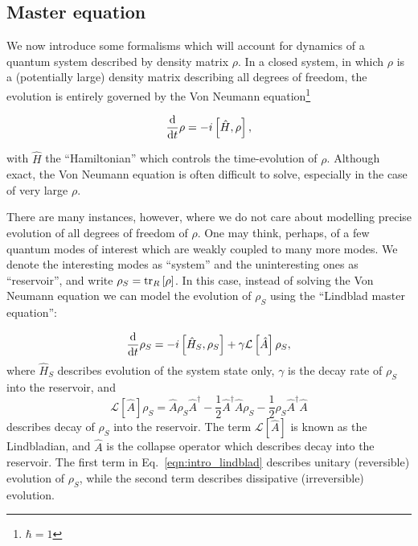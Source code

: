 \FloatBarrier
\subsection{Master equation}

We now introduce some formalisms which will account for dynamics of a quantum system described by density matrix $\rho$. In a closed system, in which $\rho$ is a (potentially large) density matrix describing all degrees of freedom, the evolution is entirely governed by the Von Neumann equation\footnote{$\hbar = 1$}

\begin{equation}
\frac{\mathrm{d}}{\mathrm{d}t} \rho = - i \left[\hat{H}, \rho \right],
\end{equation}

\noindent with $\hat{H}$ the ``Hamiltonian'' which controls the time-evolution of $\rho$. Although exact, the Von Neumann equation is often difficult to solve, especially in the case of very large $\rho$.

There are many instances, however, where we do not care about modelling precise evolution of all degrees of freedom of $\rho$. One may think, perhaps, of a few quantum modes of interest which are weakly coupled to many more modes. We denote the interesting modes as ``system'' and the uninteresting ones as ``reservoir'', and write $\rho_S = \tr_R\left[\rho\right]$. In this case, instead of solving the Von Neumann equation we can model the evolution of $\rho_S$ using the ``Lindblad master equation'':

\begin{equation}\label{eqn:intro_lindblad}
\frac{\mathrm{d}}{\mathrm{d}t} \rho_S = - i \left[ \hat{H}_S, \rho_S \right] + \gamma \mathcal{L}\left[\hat{A}\right] \rho_S,
\end{equation}
where $\hat{H}_S$ describes evolution of the system state only, $\gamma$ is the decay rate of $\rho_S$ into the reservoir, and 
\begin{equation}
\mathcal{L}\left[\hat{A}\right] \rho_S = \hat{A} \rho_S \hat{A}^\dagger - \frac{1}{2} \hat{A}^\dagger \hat{A} \rho_S - \frac{1}{2} \rho_S \hat{A}^\dagger \hat{A}
\end{equation}
describes decay of $\rho_S$ into the reservoir. The term $\mathcal{L}\left[\hat{A}\right]$ is known as the Lindbladian, and $\hat{A}$ is the collapse operator which describes decay into the reservoir. The first term in Eq.~\ref{eqn:intro_lindblad} describes unitary (reversible) evolution of $\rho_S$, while the second term describes dissipative (irreversible) evolution.

